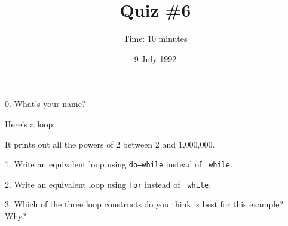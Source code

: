

\topmargin -0.5in
\textheight 9in

\title{Quiz \#6}
\date{9 July 1992}
\author{Time: 10 minutes}


\maketitle

0. What's your name?

\vspace{.5in}

Here's a loop:


It prints out all the powers of 2 between 2 and 1,000,000.

1.  Write an equivalent loop using {\tt do{\rm--}while} instead of {\tt
while}.  
\vspace{2in}

2.  Write an equivalent loop using {\tt for} instead of {\tt
while}.  
\vspace{2in}

3.  Which of the three loop constructs do you think is best for this
example?  Why?


